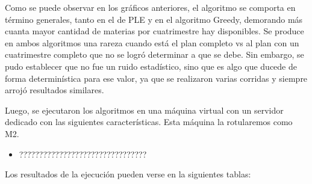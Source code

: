 \documentclass[a4paper]{article}
\begin{document}
Como se puede observar en los gráficos anteriores, el algoritmo se comporta en término generales, tanto en el de PLE y en el algoritmo Greedy, demorando más cuanta mayor cantidad de materias por cuatrimestre hay disponibles. Se produce en ambos algoritmos una rareza cuando está el plan completo vs al plan con un cuatrimestre completo que no se logró determinar a que se debe. Sin embargo, se pudo establecer que no fue un ruido estadístico, sino que es algo que ducede de forma determinística para ese valor, ya que se realizaron varias corridas y siempre arrojó resultados similares.

Luego, se ejecutaron los algoritmos en una máquina virtual con un servidor dedicado con las siguientes características. Esta máquina la rotularemos como M2.

\begin{itemize}
	\item ????????????????????????????????
\end{itemize}

Los resultados de la ejecución pueden verse en la siguientes tablas:
\end{document}
